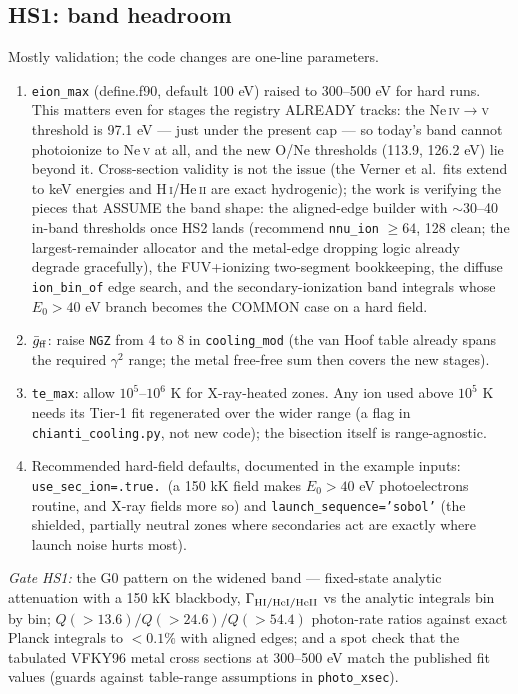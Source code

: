 \documentclass[english,a4paper]{my_memo}
\newcommand{\code}[1]{\texttt{#1}}
\newcommand{\HI}{H\,\textsc{i}}
\newcommand{\HeII}{He\,\textsc{ii}}
\begin{document}
\subsection{HS1: band headroom}

Mostly validation; the code changes are one-line parameters.

\begin{enumerate}[leftmargin=2em]
\item \code{eion\_max} (define.f90, default 100 eV) raised to
  300--500 eV for hard runs.  This matters even for stages the registry
  ALREADY tracks: the Ne\,\textsc{iv}$\to$\textsc{v} threshold is
  97.1 eV --- just under the present cap --- so today's band cannot
  photoionize to Ne\,\textsc{v} at all, and the new O/Ne thresholds
  (113.9, 126.2 eV) lie beyond it.  Cross-section validity is not the
  issue (the Verner et al.\ fits extend to keV energies and \HI/\HeII{}
  are exact hydrogenic); the work is verifying the pieces that ASSUME
  the band shape: the aligned-edge builder with $\sim$30--40 in-band
  thresholds once HS2 lands (recommend \code{nnu\_ion} $\geq 64$, 128
  clean; the largest-remainder allocator and the metal-edge dropping
  logic already degrade gracefully), the FUV+ionizing two-segment
  bookkeeping, the diffuse \code{ion\_bin\_of} edge search, and the
  secondary-ionization band integrals whose $E_0>40$ eV branch becomes
  the COMMON case on a hard field.
\item $\bar g_{\rm ff}$: raise \code{NGZ} from 4 to 8 in
  \code{cooling\_mod} (the van Hoof table already spans the required
  $\gamma^2$ range; the metal free-free sum then covers the new
  stages).
\item \code{te\_max}: allow $10^5$--$10^6$ K for X-ray-heated zones.
  Any ion used above $10^5$ K needs its Tier-1 fit regenerated over the
  wider range (a flag in \code{chianti\_cooling.py}, not new code); the
  bisection itself is range-agnostic.
\item Recommended hard-field defaults, documented in the example
  inputs: \code{use\_sec\_ion=.true.}\ (a 150 kK field makes
  $E_0>40$ eV photoelectrons routine, and X-ray fields more so) and
  \code{launch\_sequence='sobol'} (the shielded, partially neutral
  zones where secondaries act are exactly where launch noise hurts
  most).
\end{enumerate}

\emph{Gate HS1:} the G0 pattern on the widened band --- fixed-state
analytic attenuation with a 150 kK blackbody, $\Gamma_{\rm HI/HeI/HeII}$
vs the analytic integrals bin by bin; $Q(>13.6)/Q(>24.6)/Q(>54.4)$
photon-rate ratios against exact Planck integrals to $<0.1\%$ with
aligned edges; and a spot check that the tabulated VFKY96 metal cross
sections at 300--500 eV match the published fit values (guards against
table-range assumptions in \code{photo\_xsec}).
\end{document}

